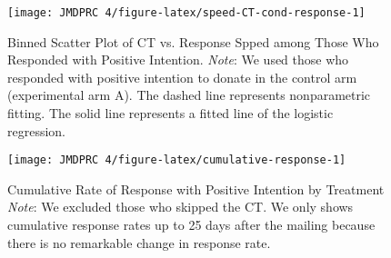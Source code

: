 \documentclass[12pt, a4paper]{article}
\begin{document}
\begin{table}[H]
\begin{threeparttable}
\begin{tablenotes}
\end{tablenotes}
\end{threeparttable}
\end{table}

\begin{figure}[H]
\texttt{[image: JMDPRC~4/figure-latex/speed-CT-cond-response-1]} \caption{Binned Scatter Plot of CT vs. Response Spped among Those Who Responded with Positive Intention. \newline \emph{Note}: We used those who responded with positive intention to donate in the control arm (experimental arm A). The dashed line represents nonparametric fitting. The solid line represents a fitted line of the logistic regression.}\label{fig:speed-CT-cond-response}
\end{figure}

\begin{figure}[t]
\texttt{[image: JMDPRC~4/figure-latex/cumulative-response-1]} \caption{Cumulative Rate of Response with Positive Intention by Treatment \newline \emph{Note}: We excluded those who skipped the CT. We only shows cumulative response rates up to 25 days after the mailing because there is no remarkable change in response rate.}\label{fig:cumulative-response}
\end{figure}
\end{document}
